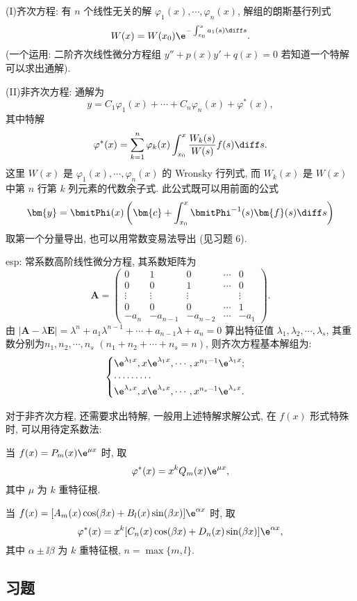 (I)齐次方程: 有 $n$ 个线性无关的解 $\varphi_1(x),\cdots,\varphi_n(x)$, 解组的朗斯基行列式
\[W(x)=W(x_0)\e^{-\int_{x_0}^xa_1(s)\diff s}.\]
(一个运用: 二阶齐次线性微分方程组 $y''+p(x)y'+q(x)=0$ 若知道一个特解可以求出通解).

(II)非齐次方程: 通解为
\[y=C_1\varphi_1(x)+\cdots+C_n\varphi_n(x)+\varphi^*(x),\] 
其中特解
\[\varphi^*(x)=\sum_{k=1}^n\varphi_k(x)\int_{x_0}^x\frac{W_k(s)}{W(s)}f(s)\diff s.\] 
这里 $W(x)$ 是 $\varphi_1(x),\cdots,\varphi_n(x)$
的 Wronsky 行列式, 而 $W_k(x)$ 是 $W(x)$ 中第 $n$ 行第 $k$ 列元素的代数余子式.
此公式既可以用前面的公式 
\[\bm{y}=\bmitPhi(x)\left(\bm{c}+\int_{x_0}^x\bmitPhi^{-1}(s)\bm{f}(s)\diff s\right)\]
取第一个分量导出, 也可以用常数变易法导出 (见习题 6).

esp: 常系数高阶线性微分方程, 其系数矩阵为
\[\bm{A} = 
  \begin{pmatrix}
    0 & 1 & 0 & \cdots & 0 \\
    0 & 0 & 1 & \cdots & 0 \\
    \vdots&\vdots&\vdots&&\vdots \\
    0 & 0 & 0 & \cdots & 1 \\
    -a_n&-a_{n-1}&-a_{n-2}&\cdots&-a_1
  \end{pmatrix}.\]
由 $|\bm{A}-\lambda\bm{E}|=\lambda^n+a_1\lambda^{n-1}+\cdots+a_{n-1}\lambda+a_n=0$
算出特征值 $\lambda_1,\lambda_2,\cdots,\lambda_s$, 其重数分别为$n_1,n_2,\cdots,n_s$
$(n_1+n_2+\cdots+n_s=n)$, 则齐次方程基本解组为:
\[\begin{cases}
\e^{\lambda_1x},x\e^{\lambda_1x},\cdots,x^{n_1-1}\e^{\lambda_1x};\\
\cdots\cdots\cdots\\
\e^{\lambda_sx},x\e^{\lambda_sx},\cdots,x^{n_s-1}\e^{\lambda_sx}.
\end{cases}\]

对于非齐次方程, 还需要求出特解, 一般用上述特解求解公式, 在 $f(x)$ 形式特殊时, 可以用待定系数法:

当 $f(x)=P_m(x)\e^{\mu x}$ 时, 取
\[\varphi^*(x)=x^kQ_m(x)\e^{\mu x},\]
其中 $\mu$ 为 $k$ 重特征根.

当 $f(x)=[A_m(x)\cos(\beta x)+B_l(x)\sin(\beta x)]\e^{\alpha x}$ 时, 取
\[\varphi^*(x)=x^k[C_n(x)\cos(\beta x)+D_n(x)\sin(\beta x)]\e^{\alpha x},\]
其中 $\alpha\pm\ii\beta$ 为 $k$ 重特征根, $n=\max\{m,l\}$.



\subsection{习题}



